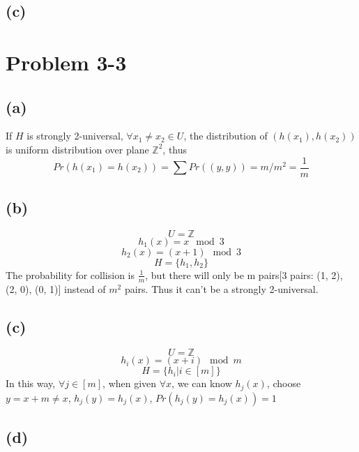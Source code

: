 \documentclass{article}
\begin{document}
  \subsection*{(c)}



\section*{Problem 3-3}
  \subsection*{(a)}
    If $H$ is strongly 2-universal, $\forall x_1 \neq x_2 \in U$, the distribution of $(h(x_1), h(x_2))$ is uniform distribution over plane $\mathbb{Z}^2$, thus
    $$ Pr(h(x_1) = h(x_2)) = \sum Pr((y, y)) = m / m^2 = \frac{1}{m}$$
  \subsection*{(b)}
    $$ U = \mathbb{Z}$$
    $$h_1(x) = x \mod 3$$
    $$h_2(x) = (x+1) \mod 3$$
    $$H = \{h_1, h_2\}$$
    The probability for collision is $\frac{1}{m}$, but there will only be m pairs[3 pairs: (1, 2), (2, 0), (0, 1)] instead of $m^2$ pairs. Thus it can't be a strongly 2-universal.
  \subsection*{(c)}
    $$ U = \mathbb{Z}$$
    $$h_i(x) = (x+i) \mod m$$
    $$H = \{h_i | i \in [m]\}$$
    In this way, $\forall j \in [m]$, when given  $\forall x$, we can know $h_j(x)$, choose $y = x + m \neq x$, $h_j(y) = h_j(x)$, $Pr(h_j(y) = h_j(x)) = 1$

  \subsection*{(d)}
\end{document}

